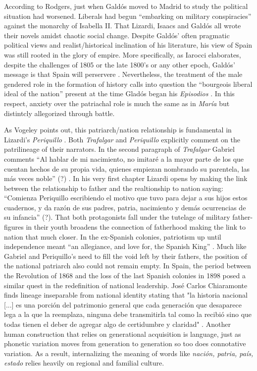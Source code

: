 \documentclass[12pt]{report}
\begin{document}
According to Rodgers, just when Galdós moved to Madrid to study the political situation had worsened.
Liberals had begun \enquote{embarking on military conspiracies} against the monarchy of Isabella II.
That Lizardi, Isaacs and Galdós all wrote their novels amidst chaotic social change.
Despite Galdós' often pragmatic political views and realist/historical inclination of his literature, his view of Spain was still rooted in the glory of empire. 
More specifically, as Iarocci elaborates, despite the challenges of 1805 or the late 1800's or any other epoch, Galdós' message is that Spain will perservere \cite[200]{Iarocci2004}.
Nevertheless, the treatment of the male gendered role in the formation of history calls into question the \enquote{bourgeois liberal ideal of the nation} present at the time Gladós began his \textit{Episodios} \cite[200]{Iarocci2004}.
In this respect, anxiety over the patriachal role is much the same as in \textit{María} but distintcly allegorized through battle.

As Vogeley points out, this patriarch/nation relationship is fundamental in Lizardi's \textit{Periquillo} \cite[99]{Vogeley2001}.
Both \textit{Trafalgar} and \textit{Periquillo} explicitly comment on the patrilineage of their narrators.
In the second paragraph of \textit{Trafalgar} Gabriel comments \enquote{Al hablar de mi nacimiento, no imitaré a la mayor parte de los que
cuentan hechos de su propia vida, quienes empiezan nombrando su parentela, las más veces noble} (?) \cite[add. text]{Galdós...}.
In his very first chapter Lizardi opens by making the link between the relationship to father and the realtionship to nation saying: \enquote{Comienza Periquillo escribiendo el motivo que tuvo para dejar a sus hijos estos cuadernos, y da razón de sus padres, patria, nacimiento y demás ocurrencias de su infancia} (?). 
That both protagonists fall under the tutelage of military father-figures in their youth broadens the connection of fatherhood making the link to nation that much closer.
In the ex-Spanish colonies, patriotism up until independence meant \enquote{an allegiance, and love for, the Spanish King} \cite[94]{Vogeley2001}.
Much like Gabriel and Periquillo's need to fill the void left by their fathers, the position of the national patriarch also could not remain empty.
In Spain, the period between the Revolution of 1868 and the loss of the last Spanish colonies in 1898 posed a similar quest in the redefinition of national leadership.
José Carlos Chiaramonte finds lineage inseparable from national identity stating that "la historia nacional [...] es una porción del patrimonio general que cada generación que desaparece lega a la que la reemplaza, ninguna debe transmitirla tal como la recibió sino que todas tienen el deber de agregar algo de certidumbre y claridad" \cite[28]{Chiaramonte2004}.
Another human construction that relies on generational acquisition is language, just as phonetic variation moves from generation to generation so too does connotative variation.
As a result, internalizing the meaning of words like \textit{nación, patria, país, estado} relies heavily on regional and familial culture. 
\end{document}
